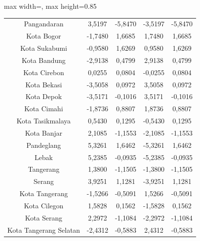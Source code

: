 \begin{table}[H]
\begin{adjustbox}{max width=\textwidth, max height=0.85\textheight}
\begin{tabular}{|c|c|c|c|c|}
Pangandaran & 3,5197 & -5,8470 & -3,5197 & -5,8470 \\
Kota Bogor & -1,7480 & 1,6685 & 1,7480 & 1,6685 \\
Kota Sukabumi & -0,9580 & 1,6269 & 0,9580 & 1,6269 \\
Kota Bandung & -2,9138 & 0,4799 & 2,9138 & 0,4799 \\
Kota Cirebon & 0,0255 & 0,0804 & -0,0255 & 0,0804 \\
Kota Bekasi & -3,5058 & 0,0972 & 3,5058 & 0,0972 \\
Kota Depok & -3,5171 & -0,1016 & 3,5171 & -0,1016 \\
Kota Cimahi & -1,8736 & 0,8807 & 1,8736 & 0,8807 \\
Kota Tasikmalaya & 0,5430 & 0,1295 & -0,5430 & 0,1295 \\
Kota Banjar & 2,1085 & -1,1553 & -2,1085 & -1,1553 \\
Pandeglang & 5,3261 & 1,6462 & -5,3261 & 1,6462 \\
Lebak & 5,2385 & -0,0935 & -5,2385 & -0,0935 \\
Tangerang & 1,3800 & -1,1505 & -1,3800 & -1,1505 \\
Serang & 3,9251 & 1,1281 & -3,9251 & 1,1281 \\
Kota Tangerang & -1,5266 & -0,5091 & 1,5266 & -0,5091 \\
Kota Cilegon & 1,5828 & 0,1562 & -1,5828 & 0,1562 \\
Kota Serang & 2,2972 & -1,1084 & -2,2972 & -1,1084 \\
Kota Tangerang Selatan & -2,4312 & -0,5883 & 2,4312 & -0,5883 \\
\hline
\end{tabular}
\end{adjustbox}
\end{table}